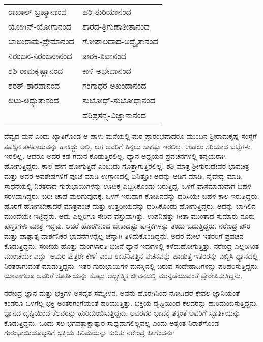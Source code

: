 \begin{longtable}{ll}
ರಾಖಾಲ್-ಬ್ರಹ್ಮಾನಾಂದ & ಹರಿ-ತುರಿಯಾನಂದ \\
ಯೋಗಿನ್-ಯೋಗಾನಂದ & ಶಾರದ-ತ್ರಿಗುಣಾತೀತಾನಂದ \\
ಬಾಬುರಾಮ-ಪ್ರೇಮಾನಂದ & ಗೋಪಾಲದಾದ-ಅದ್ವೈತಾನಂದ \\
ನಿರಂಜನ-ನಿರಂಜನಾನಂದ & ತಾರಕ-ಶಿವಾನಂದ \\
ಶಶಿ-ರಾಮಕೃಷ್ಣಾನಂದ & ಕಾಳಿ-ಅಭೇದಾನಂದ \\
ಶರತ್-ಶಾರದಾನಂದ & ಗಂಗಾಧರ-ಅಖಂಡಾನಂದ \\
ಲಟು-ಅದ್ಭುತಾನಂದ & ಸುಬೋಧ್-ಸುಬೋಧಾನಂದ \\
 & ಹರಿಪ್ರಸನ್ನ-ವಿಜ್ಞಾನಾನಂದ \\
\end{longtable}

ದೆವ್ವದ ಮನೆ ಎಂದು ಖ್ಯಾತಿಗೊಂಡ ಆ ಪಾಳು ಮನೆಯಲ್ಲಿ ಮಠ ಪ್ರಾರಂಭವಾದರೂ ಮುಂದಿನ ಶ‍್ರೀರಾಮಕೃಷ್ಣ ಸಂಸ್ಥೆಗೆ ತಪಸ್ಸಿನ ತಳಪಾಯವನ್ನು ಹಾಕಿದ್ದು ಅಲ್ಲಿ. ಆಗ ಅವರಿಗೆ ತಿನ್ನಲು ಸಾಕಷ್ಟು ಇರಲಿಲ್ಲ. ಉಡಲು ಸರಿಯಾದ ಬಟ್ಟೆಗಳು ಇರಲಿಲ್ಲ. ಆದರೂ ಅದರ ಕಡೆ ಗಮನ ಕೊಡುತ್ತಿರಲಿಲ್ಲ. ಧ್ಯಾನ ಅಧ್ಯಯನ ಪ್ರವಚನಗಳಲ್ಲಿ ತನ್ಮಯರಾಗಿ ಹೋಗುತ್ತಿದ್ದರು. ಕಾಲ ಹೇಗೆ ಹೋಗುತ್ತಿದೆ ಎಂಬುದು ಗೊತ್ತಾಗುತ್ತಿರಲಿಲ್ಲ. ಶಶಿ ಮಾತ್ರ ಶ‍್ರೀಗುರುದೇವರ ಭಾವಚಿತ್ರ ಮತ್ತು ಅವರ ಅವಶೇಷಗಳಿಗೆ ಪೂಜೆ ಮಾಡಿ ಉಗ್ರಾಣದಲ್ಲಿ ಏನಿತ್ತೋ ಅದನ್ನು ಅಡಿಗೆ ಮಾಡಿ, ನೈವೇದ್ಯ ಮಾಡಿ, ಸಾಧನೆಯಲ್ಲಿ ನಿರತರಾದ ಗುರುಭಾಯಿಗಳನ್ನು ಊಟಕ್ಕೆ ಎಬ್ಬಿಸಿಕೊಂಡು ಬರುತ್ತಿದ್ದ. ಒಳಗೆ ವಾಸಮಾಡುವಾಗ ಬಹಳ ಸರಳವಾಗಿದ್ದರು. ಬರೀ ಚಾಪೆ ಮಲಗುವುದಕ್ಕೆ. ಒಳಗೆ ಇರುವಾಗ ಕೋಪಿನವನ್ನು ಧರಿಸಿಯೇ ಬಹಳ ಕಾಲ ಇರುತ್ತಿದ್ದರು. ಹೊರಗೆ ಹೋಗಬೇಕಾದರೆ ಮಾತ್ರಪಂಚೆ ಮತ್ತು ಉತ್ತರೀಯವನ್ನು ಧರಿಸಿಕೊಂಡು ಹೋಗುತ್ತಿದ್ದರು. ಅದನ್ನು ಬಾಗಿಲಿನ ಮುಂದೆಯೇ ಇಟ್ಟಿದ್ದರು. ಅದು ಎಲ್ಲರಿಗೂ ಸೇರಿದ ವಸ್ತುವಾಗಿತ್ತು. ಉಪನಿಷತ್ತು ಗೀತಾ ಮುಂತಾದ ಸುಮಾರು ನೂರು ಪುಸ್ತಕಗಳು ಮಾತ್ರ ಇದ್ದವು. ಆದರೆ ಹೊರಗಿನಿಂದ ಬೇಕಾದಷ್ಟು ಪುಸ್ತಕಗಳನ್ನು ತಂದು ಓದುತ್ತಿದ್ದರು. ನರೇಂದ್ರ ಪೌರ ಮತ್ತು ಪಾಶ್ಚಾತ್ಯ ದಾರ್ಶನಿಕರ ಭಾವನೆಗಳನ್ನೆಲ್ಲ ಚೆನ್ನಾಗಿ ತಿಳಿದುಕೊಂಡಿದ್ದನು. ಅದರ ಮೇಲೆ ಇತರರಿಗೆ ಪ್ರವಚನ ಕೊಡುತ್ತಿದ್ದನು. ಸಂಜೆಯ ಹೊತ್ತು ಮಂಗಳಾರತಿ ಭಜನೆ ಧ್ಯಾನ ಇವುಗಳಲ್ಲಿ ಕಳೆದುಹೋಗುತ್ತಿತ್ತು. ನರೇಂದ್ರ ಎಲ್ಲರಿಗಿಂತ ಮುಂಚೆಯೇ ಎದ್ದು ‘ಅಮರ ಪುತ್ರರೇ ಕೇಳಿ’ ಎಂಬ ಉಪನಿಷತ್ತಿನ ವಚನವನ್ನು ಹಾಡುತ್ತ ಇತರರನ್ನು ಎಬ್ಬಿಸಿ ಧ್ಯಾನದಲ್ಲಿ ನಿರತರಾಗುವಂತೆ ಮಾಡುತ್ತಿದ್ದನು. ಇತರ ಗುರುಭಾಯಿಗಳ ಮನಸ್ಸಿನಲ್ಲಿ ಬರುವ ಸಂದೇಹಾದಿಗಳನ್ನು ಪರಿಹರಿಸುತ್ತಿದ್ದನು. ಯಾವಾಗಲೂ ಅವರಿಗೆ ಸ್ಫೂರ್ತಿಯನ್ನು ಕೊಟ್ಟು ಆಧ್ಯಾತ್ಮಿಕ ಜೀವನದಲ್ಲಿ ಮುನ್ನಡೆಯುವಂತೆ ಪ್ರೇರೇಪಿಸುತ್ತಿದ್ದನು.

ನರೇಂದ್ರ ಜ್ಞಾನ ಮತ್ತು ಭಕ್ತಿಗಳ ಅಸದೃಶ ಸಮ್ಮೇಳನ. ಅವನು ಹೊರಗಿನಿಂದ ನೋಡಿದರೆ ಕೇವಲ ಜ್ಞಾನಿಯಂತೆ ಕಂಡರೂ ಒಳಗೆಲ್ಲ ಭಕ್ತಿ ಅಂತರಗಂಗೆಯಂತೆ ಹರಿಯುತ್ತಿತ್ತು. ಭಕ್ತಿಯ ದೃಷ್ಟಿಯಿಂದ ಕೆಲವರನ್ನು ಹುರಿದುಂಬಿಸುತ್ತಿದ್ದನು. ಜ್ಞಾನದ ದೃಷ್ಟಿಯಿಂದ ಕೆಲವರನ್ನು ಹುರಿದುಂಬಿಸುತ್ತಿದ್ದನು. ಅವರವರ ಭಾವಕ್ಕೆ ತಕ್ಕಂತೆ ಅವರಿಗೆ ಸ್ಫೂರ್ತಿಯನ್ನು ಕೊಡುತ್ತಿದ್ದನು. ಒಂದು ಸಲ ಭಗವತ್ಸಾಕ್ಷಾತ್ಕಾರ ಸಾಧ್ಯವಾಗಲಿಲ್ಲವಲ್ಲ ಎಂದು ಅತ್ಯಂತ ನಿರಾಶೆಗೊಂಡ ಗುರುಭಾಯಿಯೊಬ್ಬನಿಗೆ ಭಕ್ತಿಯ ಹಿರಿಮೆಯನ್ನು ಕುರಿತು ನರೇಂದ್ರ ಹೀಗೆಂದನು:

